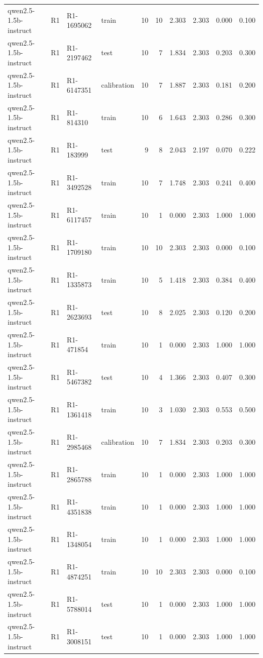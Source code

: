 \begin{table}
\begin{tabular}{llllrrrrrr}
qwen2.5-1.5b-instruct & R1 & R1-1695062 & train & 10 & 10 & 2.303 & 2.303 & 0.000 & 0.100 \\
qwen2.5-1.5b-instruct & R1 & R1-2197462 & test & 10 & 7 & 1.834 & 2.303 & 0.203 & 0.300 \\
qwen2.5-1.5b-instruct & R1 & R1-6147351 & calibration & 10 & 7 & 1.887 & 2.303 & 0.181 & 0.200 \\
qwen2.5-1.5b-instruct & R1 & R1-814310 & train & 10 & 6 & 1.643 & 2.303 & 0.286 & 0.300 \\
qwen2.5-1.5b-instruct & R1 & R1-183999 & test & 9 & 8 & 2.043 & 2.197 & 0.070 & 0.222 \\
qwen2.5-1.5b-instruct & R1 & R1-3492528 & train & 10 & 7 & 1.748 & 2.303 & 0.241 & 0.400 \\
qwen2.5-1.5b-instruct & R1 & R1-6117457 & train & 10 & 1 & 0.000 & 2.303 & 1.000 & 1.000 \\
qwen2.5-1.5b-instruct & R1 & R1-1709180 & train & 10 & 10 & 2.303 & 2.303 & 0.000 & 0.100 \\
qwen2.5-1.5b-instruct & R1 & R1-1335873 & train & 10 & 5 & 1.418 & 2.303 & 0.384 & 0.400 \\
qwen2.5-1.5b-instruct & R1 & R1-2623693 & test & 10 & 8 & 2.025 & 2.303 & 0.120 & 0.200 \\
qwen2.5-1.5b-instruct & R1 & R1-471854 & train & 10 & 1 & 0.000 & 2.303 & 1.000 & 1.000 \\
qwen2.5-1.5b-instruct & R1 & R1-5467382 & test & 10 & 4 & 1.366 & 2.303 & 0.407 & 0.300 \\
qwen2.5-1.5b-instruct & R1 & R1-1361418 & train & 10 & 3 & 1.030 & 2.303 & 0.553 & 0.500 \\
qwen2.5-1.5b-instruct & R1 & R1-2985468 & calibration & 10 & 7 & 1.834 & 2.303 & 0.203 & 0.300 \\
qwen2.5-1.5b-instruct & R1 & R1-2865788 & train & 10 & 1 & 0.000 & 2.303 & 1.000 & 1.000 \\
qwen2.5-1.5b-instruct & R1 & R1-4351838 & train & 10 & 1 & 0.000 & 2.303 & 1.000 & 1.000 \\
qwen2.5-1.5b-instruct & R1 & R1-1348054 & train & 10 & 1 & 0.000 & 2.303 & 1.000 & 1.000 \\
qwen2.5-1.5b-instruct & R1 & R1-4874251 & train & 10 & 10 & 2.303 & 2.303 & 0.000 & 0.100 \\
qwen2.5-1.5b-instruct & R1 & R1-5788014 & test & 10 & 1 & 0.000 & 2.303 & 1.000 & 1.000 \\
qwen2.5-1.5b-instruct & R1 & R1-3008151 & test & 10 & 1 & 0.000 & 2.303 & 1.000 & 1.000 \\

\end{tabular}
\end{table}
